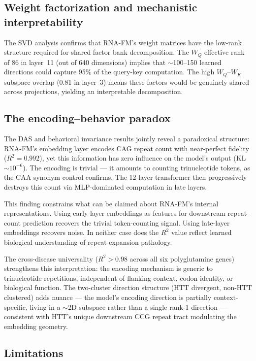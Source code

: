 \documentclass[11pt]{article}
\begin{document}
\subsection{Weight factorization and mechanistic interpretability}

The SVD analysis confirms that RNA-FM's weight matrices have the
low-rank structure required for shared factor bank decomposition. The
$W_Q$ effective rank of 86 in layer~11 (out of 640 dimensions)
implies that $\sim$100--150 learned directions could capture 95\% of
the query-key computation. The high $W_Q$--$W_K$ subspace overlap
(0.81 in layer~3) means these factors would be genuinely shared across
projections, yielding an interpretable decomposition.

\subsection{The encoding--behavior paradox}

The DAS and behavioral invariance results jointly reveal a
paradoxical structure: RNA-FM's embedding layer encodes CAG repeat
count with near-perfect fidelity ($R^2 = 0.992$), yet this information
has zero influence on the model's output (KL $\sim 10^{-6}$). The
encoding is trivial --- it amounts to counting trinucleotide tokens,
as the CAA synonym control confirms. The 12-layer transformer then
progressively destroys this count via MLP-dominated computation in
late layers.

This finding constrains what can be claimed about RNA-FM's internal
representations. Using early-layer embeddings as features for
downstream repeat-count prediction recovers the trivial token-counting
signal. Using late-layer embeddings recovers noise. In neither case
does the $R^2$ value reflect learned biological understanding of
repeat-expansion pathology.

The cross-disease universality ($R^2 > 0.98$ across all six
polyglutamine genes) strengthens this interpretation: the encoding
mechanism is generic to trinucleotide repetitions, independent of
flanking context, codon identity, or biological function. The
two-cluster direction structure (HTT divergent, non-HTT clustered)
adds nuance --- the model's encoding direction is partially
context-specific, living in a $\sim$2D subspace rather than a single
rank-1 direction --- consistent with HTT's unique downstream CCG
repeat tract modulating the embedding geometry.

\subsection{Limitations}
\end{document}
